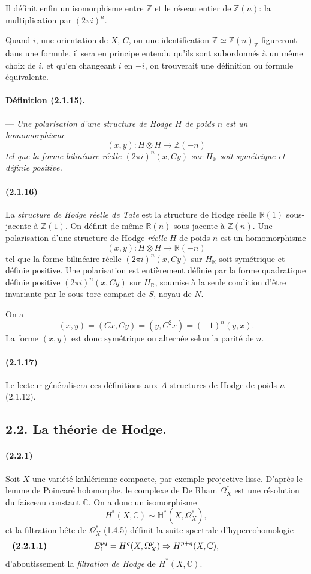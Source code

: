 \documentclass[10pt]{article}
\newcommand{\C}{\mathbb C}
\newcommand{\Z}{\mathbb Z}
\newcommand{\R}{\mathbb R}
\begin{document}
Il définit enfin un isomorphisme entre $\Z$ et le réseau entier de $\Z(n)$: la multiplication par $(2\pi i)^n$.

Quand $i$, une orientation de $X$, $C$, ou une identification $\Z\simeq\Z(n)_\Z$ figureront dans une formule, il sera en principe entendu qu'ils sont subordonnés à un même choix de $i$, et qu'en changeant $i$ en $-i$, on trouverait une définition ou formule équivalente.

\paragraph{Définition (2.1.15).} --- {\itshape Une polarisation d'une structure de Hodge $H$ de poids $n$ est un homomorphisme
\[
(x,y):H\otimes H\longrightarrow\Z(-n)
\]
tel que la forme bilinéaire réelle $(2\pi i)^n(x,Cy)$ sur $H_\R$ soit symétrique et définie positive.}

\paragraph{(2.1.16)} La \emph{structure de Hodge réelle de Tate} est la structure de Hodge réelle $\R(1)$ sous-jacente à $\Z(1)$. On définit de même $\R(n)$ sous-jacente à $\Z(n)$. Une polarisation d'une structure de Hodge \emph{réelle} $H$ de poids $n$ est un homomorphisme
\[
(x,y):H\otimes H\longrightarrow\R(-n)
\]
tel que la forme bilinéaire réelle $(2\pi i)^n(x,Cy)$ sur $H_\R$ soit symétrique et définie positive. Une polarisation est entièrement définie par la forme quadratique définie positive $(2\pi i)^n(x,Cy)$ sur $H_\R$, soumise à la seule condition d'être invariante par le sous-tore compact de $S$, noyau de $N$.

On a
\[
(x,y)=(Cx,Cy)=(y,C^2x)=(-1)^n(y,x).
\]
La forme $(x,y)$ est donc symétrique ou alternée selon la parité de $n$.

\paragraph{(2.1.17)} Le lecteur généralisera ces définitions aux $A$-structures de Hodge de poids $n$ (2.1.12).

\subsection*{2.2. La théorie de Hodge.}

\paragraph{(2.2.1)} Soit $X$ une variété kählérienne compacte, par exemple projective lisse. D'après le lemme de Poincaré holomorphe, le complexe de De Rham $\Omega_X^*$ est une résolution du faisceau constant $\C$. On a donc un isomorphisme
\[
H^*(X,\C)\sim\mathbb H^*(X,\Omega_X^*),
\]
et la filtration bête de $\Omega_X^*$ (1.4.5) définit la suite spectrale d'hypercohomologie
\[
\makebox[\textwidth][s]{\textbf{(2.2.1.1)}\hfill$\displaystyle E_1^{pq}=H^q(X,\Omega_X^p)\Rightarrow H^{p+q}(X,\C),$\hfill\phantom{\textbf{(2.2.1.1)}}}
\]
d'aboutissement la \emph{filtration de Hodge} de $H^*(X,\C)$.
\end{document}
